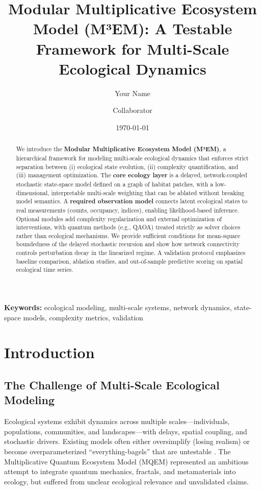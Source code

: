 \documentclass[12pt]{article}
\title{Modular Multiplicative Ecosystem Model (M³EM): A Testable Framework for Multi-Scale Ecological Dynamics}
\author{Your Name \and Collaborator}
\date{\today}
\begin{document}
\maketitle

\begin{abstract}
We introduce the \textbf{Modular Multiplicative Ecosystem Model (M³EM)}, a hierarchical framework for modeling multi-scale ecological dynamics that enforces strict separation between (i) ecological state evolution, (ii) complexity quantification, and (iii) management optimization. The \textbf{core ecology layer} is a delayed, network-coupled stochastic state-space model defined on a graph of habitat patches, with a low-dimensional, interpretable multi-scale weighting that can be ablated without breaking model semantics. A \textbf{required observation model} connects latent ecological states to real measurements (counts, occupancy, indices), enabling likelihood-based inference. Optional modules add complexity regularization and external optimization of interventions, with quantum methods (e.g., QAOA) treated strictly as solver choices rather than ecological mechanisms. We provide sufficient conditions for mean-square boundedness of the delayed stochastic recursion and show how network connectivity controls perturbation decay in the linearized regime. A validation protocol emphasizes baseline comparison, ablation studies, and out-of-sample predictive scoring on spatial ecological time series.
\end{abstract}

\textbf{Keywords:} ecological modeling, multi-scale systems, network dynamics, state-space models, complexity metrics, validation

\section{Introduction}
\label{sec:intro}

\subsection{The Challenge of Multi-Scale Ecological Modeling}
Ecological systems exhibit dynamics across multiple scales---individuals, populations, communities, and landscapes---with delays, spatial coupling, and stochastic drivers. Existing models often either oversimplify (losing realism) or become overparameterized ``everything-bagels'' that are untestable \citep{May1976}. The Multiplicative Quantum Ecosystem Model (MQEM) represented an ambitious attempt to integrate quantum mechanics, fractals, and metamaterials into ecology, but suffered from unclear ecological relevance and unvalidated claims.
\end{document}

